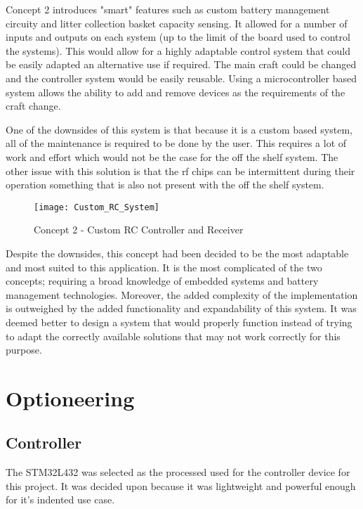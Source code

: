 \documentclass [11pt]{article}
\begin{document}
Concept 2 introduces "smart" features such as custom battery management circuity and litter collection basket capacity sensing. It allowed for a number of inputs and outputs on each system (up to the limit of the board used to control the systems). This would allow for a highly adaptable control system that could be easily adapted an alternative use if required. The main craft could be changed and the controller system would be easily reusable. Using a microcontroller based system allows the ability to add and remove devices as the requirements of the craft change.

One of the downsides of this system is that because it is a custom based system, all of the maintenance is required to be done by the user. This requires a lot of work and effort which would not be the case for the off the shelf system. The other issue with this solution is that the \gls{rf} chips can be intermittent during their operation something that is also not present with the off the shelf system.  

\begin{figure}[H]
\centerline{\texttt{[image: Custom\_RC\_System]}}
\caption{Concept 2 - Custom RC Controller and Receiver}
\label{fig:Custom_RC_System}
\end{figure} 

Despite the downsides, this concept had been decided to be the most adaptable and most suited to this application. It is the most complicated of the two concepts; requiring a broad knowledge of embedded systems and battery management technologies. Moreover, the added complexity of the implementation is outweighed by the added functionality and expandability of this system. It was deemed better to design a system that would properly function instead of trying to adapt the correctly available solutions that may not work correctly for this purpose.

\section{Optioneering}
\subsection{Controller}

The STM32L432 was selected as the processed used for the controller device for this project. It was decided upon because it was lightweight and powerful enough for it's indented use case. 
 
\end{document}
